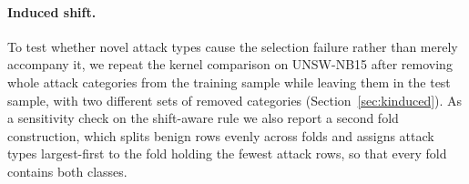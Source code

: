 \paragraph{Induced shift.} To test whether novel attack types cause the selection failure rather than
merely accompany it, we repeat the kernel comparison on UNSW-NB15 after removing whole attack categories
from the training sample while leaving them in the test sample, with two different sets of removed
categories (Section~\ref{sec:kinduced}). As a sensitivity check on the shift-aware rule we also report a
second fold construction, which splits benign rows evenly across folds and assigns attack types
largest-first to the fold holding the fewest attack rows, so that every fold contains both classes.
